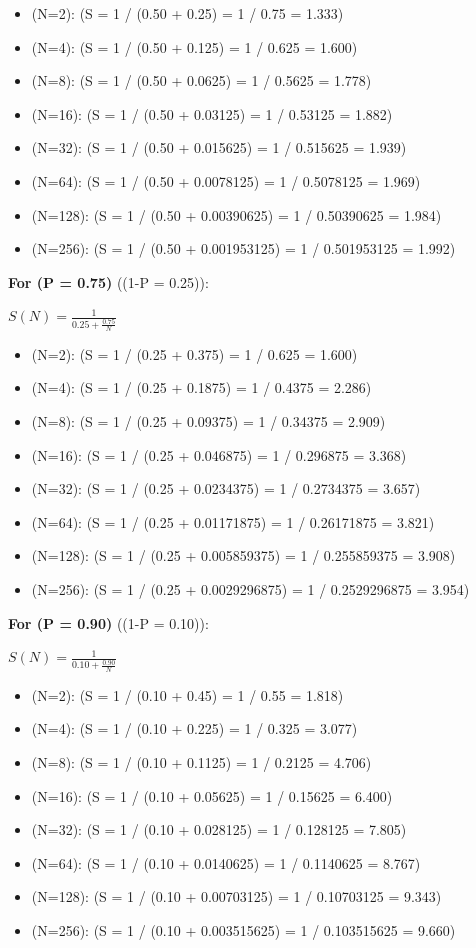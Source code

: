 \documentclass[11pt]{article}
\providecommand{\tightlist}{%
      \setlength{\itemsep}{0pt}\setlength{\parskip}{0pt}}
\begin{document}
\begin{itemize}
\tightlist
\item
  (N=2): (S = 1 / (0.50 + 0.25) = 1 / 0.75 = 1.333)
\item
  (N=4): (S = 1 / (0.50 + 0.125) = 1 / 0.625 = 1.600)
\item
  (N=8): (S = 1 / (0.50 + 0.0625) = 1 / 0.5625 = 1.778)
\item
  (N=16): (S = 1 / (0.50 + 0.03125) = 1 / 0.53125 = 1.882)
\item
  (N=32): (S = 1 / (0.50 + 0.015625) = 1 / 0.515625 = 1.939)
\item
  (N=64): (S = 1 / (0.50 + 0.0078125) = 1 / 0.5078125 = 1.969)
\item
  (N=128): (S = 1 / (0.50 + 0.00390625) = 1 / 0.50390625 = 1.984)
\item
  (N=256): (S = 1 / (0.50 + 0.001953125) = 1 / 0.501953125 = 1.992)
\end{itemize}

\textbf{For (P = 0.75)} ((1-P = 0.25)):

\(S(N) = \frac{1}{0.25 + \frac{0.75}{N}}\)

\begin{itemize}
\tightlist
\item
  (N=2): (S = 1 / (0.25 + 0.375) = 1 / 0.625 = 1.600)
\item
  (N=4): (S = 1 / (0.25 + 0.1875) = 1 / 0.4375 = 2.286)
\item
  (N=8): (S = 1 / (0.25 + 0.09375) = 1 / 0.34375 = 2.909)
\item
  (N=16): (S = 1 / (0.25 + 0.046875) = 1 / 0.296875 = 3.368)
\item
  (N=32): (S = 1 / (0.25 + 0.0234375) = 1 / 0.2734375 = 3.657)
\item
  (N=64): (S = 1 / (0.25 + 0.01171875) = 1 / 0.26171875 = 3.821)
\item
  (N=128): (S = 1 / (0.25 + 0.005859375) = 1 / 0.255859375 = 3.908)
\item
  (N=256): (S = 1 / (0.25 + 0.0029296875) = 1 / 0.2529296875 = 3.954)
\end{itemize}

\textbf{For (P = 0.90)} ((1-P = 0.10)):

\(S(N) = \frac{1}{0.10 + \frac{0.90}{N}}\)

\begin{itemize}
\tightlist
\item
  (N=2): (S = 1 / (0.10 + 0.45) = 1 / 0.55 = 1.818)
\item
  (N=4): (S = 1 / (0.10 + 0.225) = 1 / 0.325 = 3.077)
\item
  (N=8): (S = 1 / (0.10 + 0.1125) = 1 / 0.2125 = 4.706)
\item
  (N=16): (S = 1 / (0.10 + 0.05625) = 1 / 0.15625 = 6.400)
\item
  (N=32): (S = 1 / (0.10 + 0.028125) = 1 / 0.128125 = 7.805)
\item
  (N=64): (S = 1 / (0.10 + 0.0140625) = 1 / 0.1140625 = 8.767)
\item
  (N=128): (S = 1 / (0.10 + 0.00703125) = 1 / 0.10703125 = 9.343)
\item
  (N=256): (S = 1 / (0.10 + 0.003515625) = 1 / 0.103515625 = 9.660)
\end{itemize}
\end{document}
